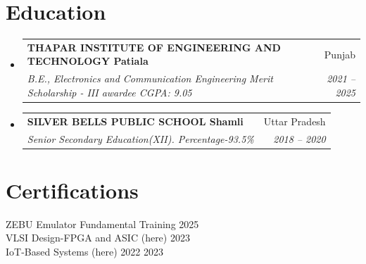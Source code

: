 \documentclass[letterpaper,11pt]{article}
\makeatletter
\newcommand{\resumeSubheading}[4]{
  \vspace{-2pt}\item
    \begin{tabular*}{\textwidth}[t]{l@{\extracolsep{\fill}}r}
      \textbf{#1} & #2 \\
      \textit{\small#3} & \textit{\small #4} \\
    \end{tabular*}\vspace{-7pt}
}
\newcommand{\resumeSubHeadingListStart}{\begin{itemize}[leftmargin=0.15in, label={}]}
\newcommand{\resumeSubHeadingListEnd}{\end{itemize}}
\makeatother
\begin{document}
\section{Education}
\resumeSubHeadingListStart
  \resumeSubheading
    { THAPAR INSTITUTE OF ENGINEERING AND TECHNOLOGY Patiala }{ Punjab }
    { B.E., Electronics and Communication Engineering \textbar{} Merit Scholarship - III awardee \textbar{} CGPA: 9.05 }
    { 2021 -- 2025 }
  \resumeSubheading
    { SILVER BELLS PUBLIC SCHOOL Shamli }{ Uttar Pradesh }
    { Senior Secondary Education(XII). Percentage-93.5\% }
    { 2018 -- 2020 }
\resumeSubHeadingListEnd

\section{Certifications}
\begin{itemize}[leftmargin=0.15in, label={}]
  \small{\item{
    ZEBU Emulator Fundamental Training 2025 \\
    VLSI Design-FPGA and ASIC (here) 2023 \\
    IoT-Based Systems (here) 2022 2023 \\
  }}
\end{itemize}
\end{document}
